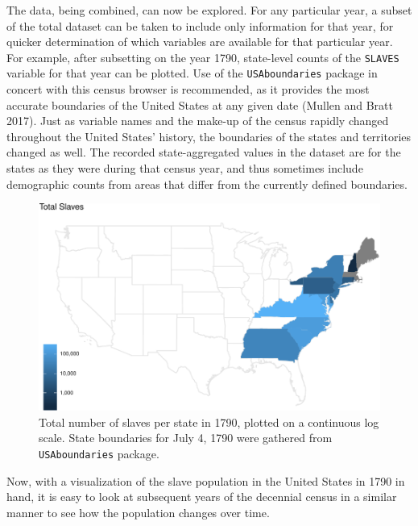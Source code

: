 \documentclass[11pt,]{article}
\begin{document}
The data, being combined, can now be explored. For any particular year,
a subset of the total dataset can be taken to include only information
for that year, for quicker determination of which variables are
available for that particular year. For example, after subsetting on the
year 1790, state-level counts of the \texttt{SLAVES} variable for that
year can be plotted. Use of the \texttt{USAboundaries} package in
concert with this census browser is recommended, as it provides the most
accurate boundaries of the United States at any given date (Mullen and
Bratt 2017). Just as variable names and the make-up of the census
rapidly changed throughout the United States' history, the boundaries of
the states and territories changed as well. The recorded
state-aggregated values in the dataset are for the states as they were
during that census year, and thus sometimes include demographic counts
from areas that differ from the currently defined boundaries.

\begin{figure}[htbp]
\centering
\includegraphics{writeup_files/figure-latex/chunk-1790-map-1.pdf}
\caption{Total number of slaves per state in 1790, plotted on a
continuous log scale. State boundaries for July 4, 1790 were gathered
from \texttt{USAboundaries} package.}
\end{figure}

Now, with a visualization of the slave population in the United States
in 1790 in hand, it is easy to look at subsequent years of the decennial
census in a similar manner to see how the population changes over time.
\end{document}
